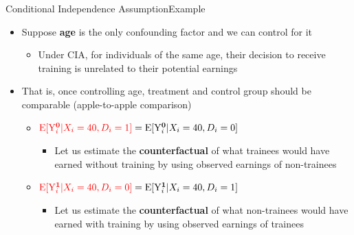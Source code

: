 \documentclass[hyperref={pdfpagelabels=false}]{beamer}
\begin{document}
\begin{frame}{Conditional Independence Assumption}{Example}
	\begin{itemize}
		
		\item Suppose \textbf{age} is the only confounding factor and we can control for it
		\vspace{0.2cm}
		\begin{itemize}
			\item Under CIA, for individuals of the same age, their decision to receive training is unrelated to their potential earnings
			\vspace{0.2cm}
		\end{itemize}
		\item That is, once controlling age, treatment and control group should be comparable (apple-to-apple comparison)
		\vspace{0.2cm}
		\begin{itemize}
			\item $\textcolor{red}{\mathrm{E}[\mathrm{Y}^{\textbf{0}}_{i}|X_{i}=40, D_i=1]}=\mathrm{E}[\mathrm{Y}^{\textbf{0}}_{i}|X_{i}=40, D_i=0]$
			\vspace{0.2cm}
					\begin{itemize}
			\item Let us estimate the \textbf{counterfactual} of what trainees would have earned without training by using observed earnings of non-trainees
						\vspace{0.2cm}
			\end{itemize}
			\item $\textcolor{red}{\mathrm{E}[\mathrm{Y}^{\textbf{1}}_{i}|X_{i}=40, D_i=0]}=\mathrm{E}[\mathrm{Y}^{\textbf{1}}_{i}|X_{i}=40, D_i=1]$
			\vspace{0.2cm}
			\begin{itemize}
				\item Let us estimate the \textbf{counterfactual} of what non-trainees would have earned with training by using observed earnings of trainees
			\end{itemize}
		\end{itemize}
		
		
		
	\end{itemize}
\end{frame}
\end{document}

